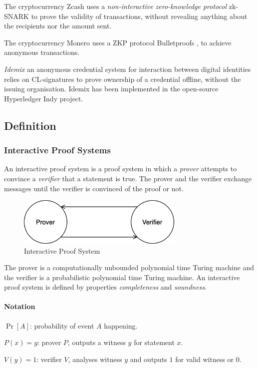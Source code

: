The cryptocurrency Zcash uses a \textit{non-interactive zero-knowledge protocol} zk-SNARK \cite{bowe2018multi} to prove the validity of transactions, without revealing anything about the recipients nor the amount sent.

The cryptocurrency Monero uses a ZKP protocol Bulletproofs \cite{bunz2018bulletproofs}, to achieve anonymous transactions.

\textit{Idemix} \cite{camenisch2002design} an anonymous credential system for interaction between digital identities relies on CL-signatures \cite{camenisch2001efficient} to prove ownership of a credential offline, without the issuing organisation.
Idemix has been implemented in the open-source Hyperledger Indy project.

\newpage
\subsection{Definition}
\subsubsection{Interactive Proof Systems}
An interactive proof system is a proof system in which a \textit{prover} attempts to convince a \textit{verifier} that a statement is true.
The prover and the verifier exchange messages until the verifier is convinced of the proof or not.

\begin{figure}[h]
	\centering
	\includegraphics[width=8cm]{images/interactive-proof-system}
	\caption{Interactive Proof System}
	\label{fig:interactive-proof-system}
\end{figure}

The prover is a computationally unbounded polynomial time Turing machine and the verifier is a probabilistic polynomial time Turing machine.
An interactive proof system is defined by properties \textit{completeness} and \textit{soundness}.

\paragraph{Notation}
\begin{description}
	\item $\Pr[A]$: probability of event $A$ happening.
	\item $P(x) = y$: prover $P$, outputs a witness $y$ for statement $x$.
	\item $V(y) = 1$: verifier $V$, analyses witness $y$ and outputs $1$ for valid witness or $0$.
\end{description}

